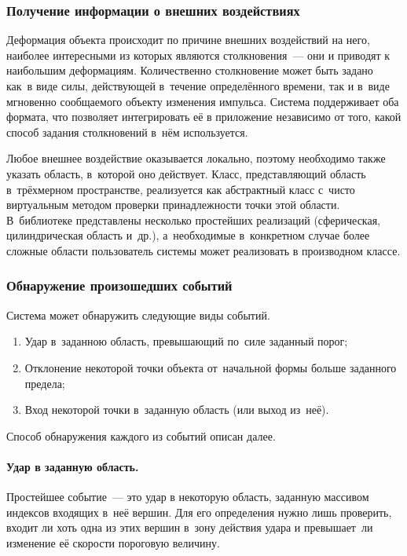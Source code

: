 \documentclass[a4paper, 14pt, titlepage]{extarticle}
\begin{document}
      \subsubsection{Получение информации о внешних воздействиях}\label{sssec:external_forces}

        Деформация объекта происходит по причине внешних воздействий на него, наиболее интересными
        из которых являются столкновения~--- они и приводят к наибольшим деформациям. Количественно
        столкновение может быть задано как~в виде силы, действующей в~течение определённого времени, так и
        в~виде мгновенно сообщаемого объекту изменения импульса.
        Система поддерживает оба формата, что позволяет интегрировать её в приложение независимо от
        того, какой способ задания столкновений в~нём используется.

        Любое внешнее воздействие оказывается локально, поэтому необходимо также указать область,
        в~которой оно действует. Класс, представляющий область в~трёхмерном пространстве,
        реализуется как абстрактный класс с~чисто виртуальным методом проверки принадлежности точки
        этой области. В~библиотеке представлены несколько простейших реализаций (сферическая,
        цилиндрическая область и~др.), а~необходимые в~конкретном случае более сложные области
        пользователь системы может реализовать в производном классе.

      \subsubsection{Обнаружение произошедших событий}\label{sssec:events}

        Система может обнаружить следующие виды событий.
        \begin{enumerate}
          \item Удар в~заданною область, превышающий по~силе заданный порог;
          \item Отклонение некоторой точки объекта от~начальной формы больше заданного предела;
          \item Вход некоторой точки в~заданную область (или выход из~неё).
        \end{enumerate}
        Способ обнаружения каждого из событий описан далее.

        \paragraph{Удар в заданную область.}
        Простейшее событие~--- это удар в некоторую область, заданную массивом индексов
        входящих в~неё вершин. Для его определения нужно лишь проверить, входит ли хоть одна из этих
        вершин в~зону действия удара и превышает~ли изменение её скорости пороговую величину.
\end{document}
